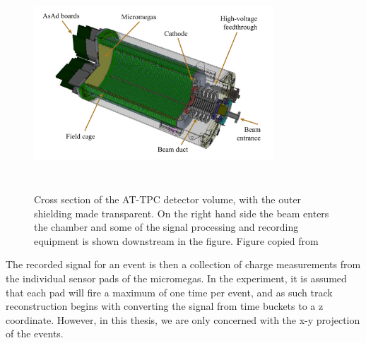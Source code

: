  \begin{figure}
 \centering
 \includegraphics[width=0.8\textwidth, height=8cm]{../plots/at_tpc_schematic}
 \caption[AT-TPC cross-section]{Cross section of the AT-TPC detector volume, with the outer shielding made transparent. On the right hand side the beam enters the chamber and some of the signal processing and recording equipment is shown downstream in the figure. Figure copied from \cite{Bradt2017a}}\label{fig:attpc_schematic}
 \end{figure}

The recorded signal for an event is then a collection of charge measurements from the individual sensor pads of the micromegas. In the experiment, it is assumed that each pad will fire a maximum of one time per event, and as such track reconstruction begins with converting the signal from time buckets to a z coordinate. However, in this thesis, we are only concerned with the x-y projection of the events. 